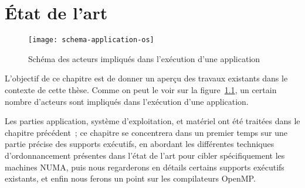 \chapter{État de l'art}\label{chap:rw}
\chaptertoc


\begin{figure}[ht]
  \centering
  \texttt{[image: schema-application-os]}
  \caption{Schéma des acteurs impliqués dans l'exécution d'une application}\label{fig:rw:application-os}
\end{figure}

L'objectif de ce chapitre est de donner un aperçu des travaux existants dans le contexte de cette thèse.
Comme on peut le voir sur la figure~\ref{fig:rw:application-os}, un certain nombre d'acteurs sont impliqués dans l'exécution d'une application.

Les parties application, système d'exploitation, et matériel ont été traitées dans le chapitre précédent~; ce chapitre se concentrera dans un premier temps sur une partie précise des supports exécutifs, en abordant les différentes techniques d'ordonnancement présentes dans l'état de l'art pour cibler spécifiquement les machines NUMA, puis nous regarderons en détails certains supports exécutifs existants, et enfin nous ferons un point sur les compilateurs OpenMP.

















